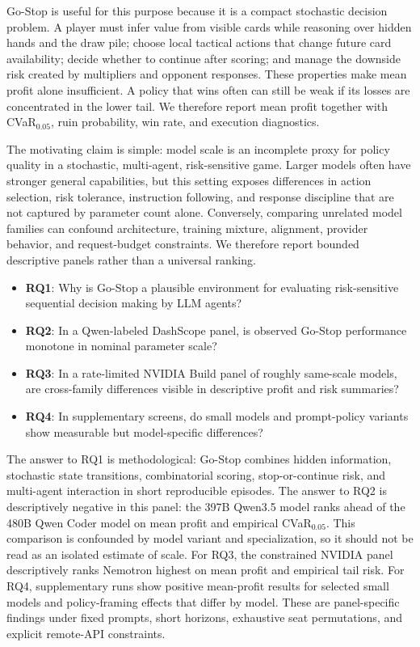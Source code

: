 \documentclass[11pt]{article}
\begin{document}
Go-Stop is useful for this purpose because it is a compact stochastic decision problem. A player must infer value from visible cards while reasoning over hidden hands and the draw pile; choose local tactical actions that change future card availability; decide whether to continue after scoring; and manage the downside risk created by multipliers and opponent responses. These properties make mean profit alone insufficient. A policy that wins often can still be weak if its losses are concentrated in the lower tail. We therefore report mean profit together with CVaR$_{0.05}$, ruin probability, win rate, and execution diagnostics.

The motivating claim is simple: model scale is an incomplete proxy for policy quality in a stochastic, multi-agent, risk-sensitive game. Larger models often have stronger general capabilities, but this setting exposes differences in action selection, risk tolerance, instruction following, and response discipline that are not captured by parameter count alone. Conversely, comparing unrelated model families can confound architecture, training mixture, alignment, provider behavior, and request-budget constraints. We therefore report bounded descriptive panels rather than a universal ranking.

\begin{itemize}
    \item \textbf{RQ1}: Why is Go-Stop a plausible environment for evaluating risk-sensitive sequential decision making by LLM agents?
    \item \textbf{RQ2}: In a Qwen-labeled DashScope panel, is observed Go-Stop performance monotone in nominal parameter scale?
    \item \textbf{RQ3}: In a rate-limited NVIDIA Build panel of roughly same-scale models, are cross-family differences visible in descriptive profit and risk summaries?
    \item \textbf{RQ4}: In supplementary screens, do small models and prompt-policy variants show measurable but model-specific differences?
\end{itemize}

The answer to RQ1 is methodological: Go-Stop combines hidden information, stochastic state transitions, combinatorial scoring, stop-or-continue risk, and multi-agent interaction in short reproducible episodes. The answer to RQ2 is descriptively negative in this panel: the 397B Qwen3.5 model ranks ahead of the 480B Qwen Coder model on mean profit and empirical CVaR$_{0.05}$. This comparison is confounded by model variant and specialization, so it should not be read as an isolated estimate of scale. For RQ3, the constrained NVIDIA panel descriptively ranks Nemotron highest on mean profit and empirical tail risk. For RQ4, supplementary runs show positive mean-profit results for selected small models and policy-framing effects that differ by model. These are panel-specific findings under fixed prompts, short horizons, exhaustive seat permutations, and explicit remote-API constraints.
\end{document}
